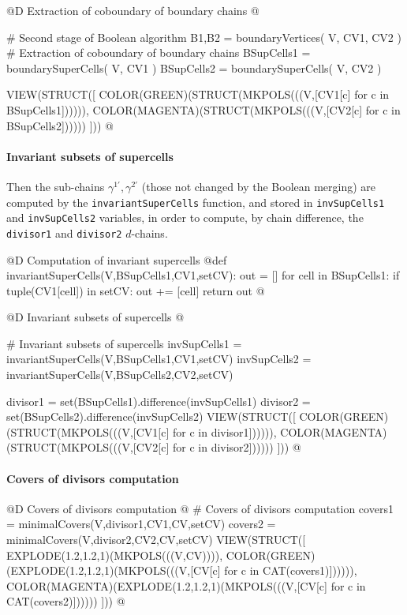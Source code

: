 \documentclass[11pt,oneside]{article}	%
\begin{document}
@D Extraction of coboundary of boundary chains
@{# Second stage of Boolean algorithm
B1,B2 = boundaryVertices( V, CV1, CV2 )
# Extraction of coboundary of boundary chains
BSupCells1 = boundarySuperCells( V, CV1 )
BSupCells2 = boundarySuperCells( V, CV2 )

VIEW(STRUCT([ 
	COLOR(GREEN)(STRUCT(MKPOLS(((V,[CV1[c] for c in BSupCells1]))))), 
	COLOR(MAGENTA)(STRUCT(MKPOLS(((V,[CV2[c] for c in BSupCells2]))))) 
])) 
@}

\paragraph{Invariant subsets of supercells}

Then the sub-chains $\gamma^{1'},\gamma^{2'}$ (those not changed by the Boolean merging) are computed by the \texttt{invariantSuperCells} function, and stored in \texttt{invSupCells1} and \texttt{invSupCells2} variables, in order to compute, by chain difference, the \texttt{divisor1} and \texttt{divisor2} $d$-chains.

@D Computation of invariant supercells
@{def invariantSuperCells(V,BSupCells1,CV1,setCV):
	out = []
	for cell in BSupCells1:
		if tuple(CV1[cell]) in setCV: out += [cell]
	return out
@}

@D Invariant subsets of supercells
@{# Invariant subsets of supercells
invSupCells1 = invariantSuperCells(V,BSupCells1,CV1,setCV)
invSupCells2 = invariantSuperCells(V,BSupCells2,CV2,setCV)

divisor1 = set(BSupCells1).difference(invSupCells1)
divisor2 = set(BSupCells2).difference(invSupCells2)
VIEW(STRUCT([ 
	COLOR(GREEN)(STRUCT(MKPOLS(((V,[CV1[c] for c in divisor1]))))), 
	COLOR(MAGENTA)(STRUCT(MKPOLS(((V,[CV2[c] for c in divisor2]))))) 
]))
@}
\paragraph{Covers of divisors computation}
@D Covers of divisors computation
@{
# Covers of divisors computation
covers1 = minimalCovers(V,divisor1,CV1,CV,setCV)
covers2 = minimalCovers(V,divisor2,CV2,CV,setCV)	
VIEW(STRUCT([ 
	EXPLODE(1.2,1.2,1)(MKPOLS(((V,CV)))), 
	COLOR(GREEN)(EXPLODE(1.2,1.2,1)(MKPOLS(((V,[CV[c] for c in CAT(covers1)]))))), 
	COLOR(MAGENTA)(EXPLODE(1.2,1.2,1)(MKPOLS(((V,[CV[c] for c in CAT(covers2)])))))
	 ]))
@}
\end{document}
